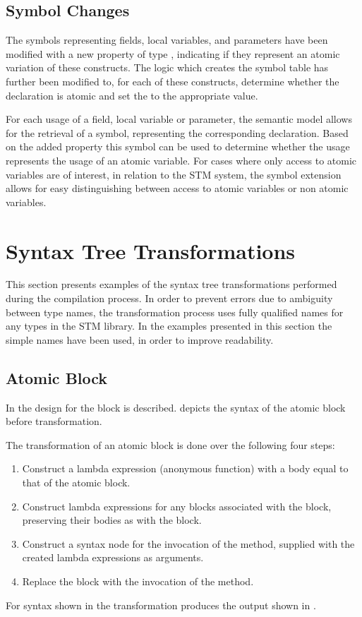 \subsection{Symbol Changes}
The symbols representing fields, local variables, and parameters have been modified with a new  property of type , indicating if they represent an atomic variation of these constructs. The logic which creates the symbol table has further been modified to, for each of these constructs, determine whether the declaration is atomic and set the  to the appropriate value.

For each usage of a field, local variable or parameter, the semantic model allows for the retrieval of a symbol, representing the corresponding declaration. Based on the added  property this symbol can be used to determine whether the usage represents the usage of an atomic variable. For cases where only access to atomic variables are of interest, in relation to the \ac{STM} system, the symbol extension allows for easy distinguishing between access to atomic variables or non atomic variables.

\section{Syntax Tree Transformations}
\label{sec:syntax_tree_transformations}
This section presents examples of the syntax tree transformations performed during the compilation process. In order to prevent errors due to ambiguity between type names, the transformation process uses fully qualified names\cite[p. 73]{csharp2013specificaiton}  for any types in the \ac{STM} library. In the examples presented in this section the simple names have been used, in order to improve readability. 

\subsection{Atomic Block}
In  the design for the  block is described.  depicts the syntax of the atomic block before transformation.

The transformation of an atomic block is done over the following four steps:
\begin{enumerate}
	\item Construct a lambda expression (anonymous function) with a body equal to that of the atomic block.
	\item Construct lambda expressions for any  blocks associated with the  block, preserving their bodies as with the  block.
	\item Construct a syntax node for the invocation of the  method, supplied with the created lambda expressions as arguments.
	\item Replace the  block with the invocation of the  method.
\end{enumerate}
For syntax shown in  the transformation produces the output shown in .

